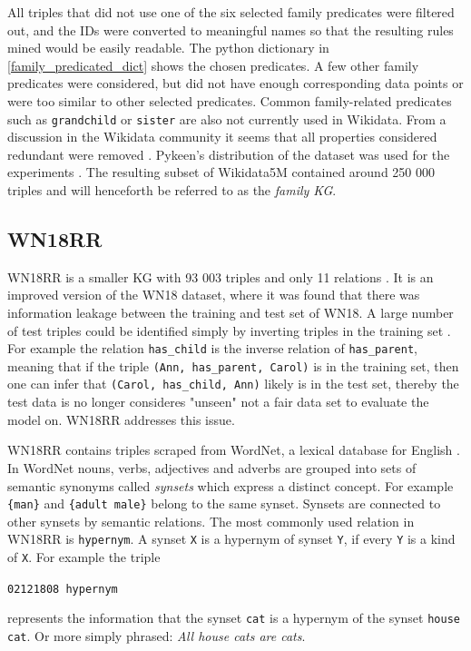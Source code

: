 All triples that did not use one of the six selected family predicates were filtered out, and the IDs were converted to meaningful names so that the resulting rules mined would be easily readable. The python dictionary in \cref{family_predicated_dict} shows the chosen predicates. A few other family predicates were considered, but did not have enough corresponding data points or were too similar to other selected predicates. Common family-related predicates such as \texttt{grandchild} or \texttt{sister} are also not currently used in Wikidata. From a discussion in the Wikidata community it seems that all properties considered redundant were removed \cite{kinship_discussion}. Pykeen's distribution of the dataset was used for the experiments \cite{ali2021pykeen}. The resulting subset of Wikidata5M contained around 250 000 triples and will henceforth be referred to as the \textit{family KG}.

\subsection{WN18RR}
WN18RR is a smaller KG with 93 003 triples and only 11 relations \cite{dettmers2018convolutional}. It is an improved version of the WN18 dataset, where it was found that there was information leakage between the training and test set of WN18. A large number of test triples could be identified simply by inverting triples in the training set \cite{toutanova2015observed}. For example the relation \texttt{has\_child} is the inverse relation of \texttt{has\_parent}, meaning that if the triple \texttt{(Ann, has\_parent, Carol)} is in the training set, then one can infer that \texttt{(Carol, has\_child, Ann)} likely is in the test set, thereby the test data is no longer consideres "unseen" not a fair data set to evaluate the model on. WN18RR addresses this issue.

WN18RR contains triples scraped from WordNet, a lexical database for English \cite{wordNet}. In WordNet nouns, verbs, adjectives and adverbs are grouped into sets of semantic synonyms called
\textit{synsets} which express a distinct concept. For example \texttt{\{man\}} and \texttt{\{adult male\}} belong to the same synset. Synsets are connected to other synsets by semantic relations. The most commonly used relation in WN18RR is \texttt{hypernym}. A synset \texttt{X} is a hypernym of synset \texttt{Y}, if every \texttt{Y} is a kind of \texttt{X}. For example the triple 
\centerline{\texttt{02121808 \quad hypernym }}
represents the information that the synset \texttt{cat} is a hypernym of the synset \texttt{house cat}. Or more simply phrased: \textit{All house cats are cats}.


